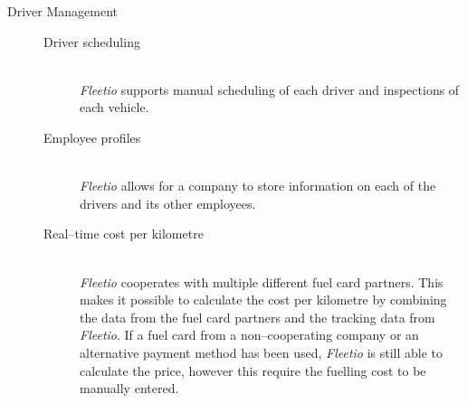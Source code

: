 \begin{description}
    \item[Driver Management] \hfill
    \begin{description}
        \item[Driver scheduling] \hfill \\
        \textit{Fleetio} supports manual scheduling of each driver and inspections of each vehicle.
        \item[Employee profiles] \hfill \\
        \textit{Fleetio} allows for a company to store information on each of the drivers and its other employees.
        \item[Real--time cost per kilometre] \hfill \\
        \textit{Fleetio} cooperates with multiple different fuel card partners.
        This makes it possible to calculate the cost per kilometre by combining the data from the fuel card partners and the tracking data from \textit{Fleetio}.
        If a fuel card from a non--cooperating company or an alternative payment method has been used, \textit{Fleetio} is still able to calculate the price, however this require the fuelling cost to be manually entered.
     \end{description}
\end{description}
